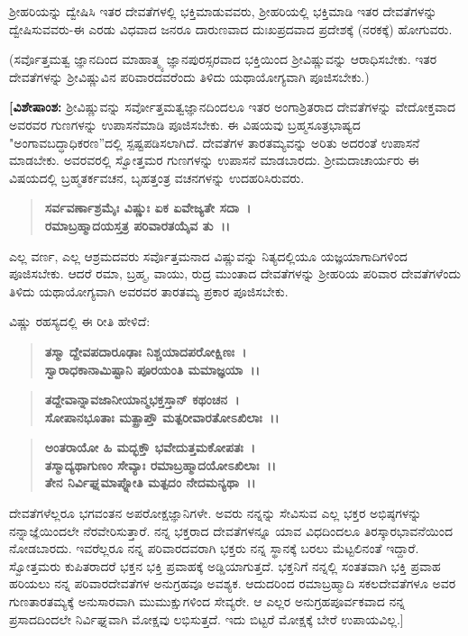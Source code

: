 ಶ‍್ರೀಹರಿಯನ್ನು ದ್ವೇಷಿಸಿ ಇತರ ದೇವತೆಗಳಲ್ಲಿ ಭಕ್ತಿಮಾಡುವವರು, ಶ‍್ರೀಹರಿಯಲ್ಲಿ ಭಕ್ತಿಮಾಡಿ ಇತರ ದೇವತೆಗಳನ್ನು ದ್ವೇಷಿಸುವವರು-ಈ ಎರಡು ವಿಧವಾದ ಜನರೂ ದಾರುಣವಾದ ದುಃಖಪ್ರದವಾದ ಪ್ರದೇಶಕ್ಕೆ (ನರಕಕ್ಕೆ) ಹೋಗುವರು.

(ಸರ್ವೊತ್ತಮತ್ವ ಜ್ಞಾನದಿಂದ ಮಾಹಾತ್ಮ್ಯ ಜ್ಞಾನಪುರಸ್ಸರವಾದ ಭಕ್ತಿಯಿಂದ ಶ‍್ರೀವಿಷ್ಣುವನ್ನು ಆರಾಧಿಸಬೇಕು. ಇತರ ದೇವತೆಗಳನ್ನು ಶ‍್ರೀವಿಷ್ಣುವಿನ ಪರಿವಾರದವರೆಂದು ತಿಳಿದು ಯಥಾಯೋಗ್ಯವಾಗಿ ಪೂಜಿಸಬೇಕು.)

\textbf{[ವಿಶೇಷಾಂಶ:} ಶ‍್ರೀವಿಷ್ಣುವನ್ನು ಸರ್ವೋತ್ತಮತ್ವಜ್ಞಾನದಿಂದಲೂ ಇತರ ಅಂಗಾಶ್ರಿತರಾದ ದೇವತೆಗಳನ್ನು ವೇದೋಕ್ತವಾದ ಅವರವರ ಗುಣಗಳನ್ನು ಉಪಾಸನೆಮಾಡಿ ಪೂಜಿಸಬೇಕು. ಈ ವಿಷಯವು ಬ್ರಹ್ಮಸೂತ್ರಭಾಷ್ಯದ "ಅಂಗಾವಬದ್ಧಾಧಿಕರಣ”ದಲ್ಲಿ ಸ್ಪಷ್ಟಪಡಿಸಲಾಗಿದೆ. ದೇವತೆ\-ಗಳ ತಾರತಮ್ಯವನ್ನು ಅರಿತು ಅದರಂತೆ ಉಪಾಸನೆ ಮಾಡಬೇಕು. ಅವರವರಲ್ಲಿ ಸ್ವೋತ್ತಮರ ಗುಣಗಳನ್ನು ಉಪಾಸನೆ ಮಾಡಬಾರದು. ಶ‍್ರೀಮದಾಚಾರ್ಯರು ಈ ವಿಷಯ\-ದಲ್ಲಿ ಬ್ರಹ್ಮತರ್ಕವಚನ, ಬೃಹತ್ತಂತ್ರ ವಚನಗಳನ್ನು ಉದಹರಿಸಿರುವರು.

\begin{verse}
\textbf{ಸರ್ವವರ್ಣಾಶ್ರಮೈಃ ವಿಷ್ಣುಃ ಏಕ ಏವೇಜ್ಯತೇ ಸದಾ~।}\\\textbf{ರಮಾಬ್ರಹ್ಮಾದಯಸ್ತತ್ರ ಪರಿವಾರತಯೈವ ತು~।।} 
\end{verse}

ಎಲ್ಲ ವರ್ಣ, ಎಲ್ಲ ಆಶ್ರಮದವರು ಸರ್ವೊತ್ತಮನಾದ ವಿಷ್ಣುವನ್ನು ನಿತ್ಯದಲ್ಲಿಯೂ ಯಜ್ಞಯಾಗಾದಿಗಳಿಂದ ಪೂಜಿಸಬೇಕು. ಆದರೆ ರಮಾ, ಬ್ರಹ್ಮ, ವಾಯು, ರುದ್ರ ಮುಂತಾದ ದೇವತೆ\-ಗಳನ್ನು ಶ‍್ರೀಹರಿಯ ಪರಿವಾರ ದೇವತೆಗಳೆಂದು ತಿಳಿದು ಯಥಾಯೋಗ್ಯವಾಗಿ ಅವರವರ ತಾರತಮ್ಯ ಪ್ರಕಾರ ಪೂಜಿಸಬೇಕು.

\begin{flushleft}
ವಿಷ್ಣು ರಹಸ್ಯದಲ್ಲಿ ಈ ರೀತಿ ಹೇಳಿದೆ: 
\end{flushleft}

\begin{verse}
\textbf{ತಸ್ಮಾ ದ್ದೇವಪದಾರೂಢಾಃ ನಿಶ್ಚಯಾದಪರೋಕ್ಷಿಣಃ~।}\\\textbf{ಸ್ವಾರಾಧಕಾನಾಮಿಷ್ಟಾನಿ ಪೂರಯಂತಿ ಮಮಾಜ್ಞಯಾ~।। }
\end{verse}

\begin{verse}
\textbf{ತದ್ದೇವಾನ್ನಾವಜಾನೀಯಾನ್ಮಭಕ್ತಸ್ತಾನ್ ಕಥಂಚನ~।}\\\textbf{ಸೋಪಾನಭೂತಾಃ ಮತ್ಪ್ರಾಪ್ತೌ ಮತ್ಪರೀವಾರತೋಽಖಿಲಾಃ~।।} 
\end{verse}

\begin{verse}
\textbf{ಅಂತರಾಯೋ ಹಿ ಮದ್ಭಕ್ತೌ ಭವೇದುತ್ತಮಕೋಪತಃ~।}\\\textbf{ತಸ್ಮಾದ್ಯಥಾಗುಣಂ ಸೇವ್ಯಾಃ ರಮಾಬ್ರಹ್ಮಾದಯೋಽಖಿಲಾಃ~।। }\\\textbf{ತೇನ ನಿರ್ವಿಘ್ನಮಾಪ್ನೋತಿ ಮತ್ಪದಂ ನೇದಮನ್ಯಥಾ~।।}
\end{verse}

ದೇವತೆಗಳೆಲ್ಲರೂ ಭಗವಂತನ ಅಪರೋಕ್ಷಜ್ಞಾನಿಗಳೇ. ಅವರು ನನ್ನನ್ನು ಸೇವಿಸುವ ಎಲ್ಲ ಭಕ್ತರ ಅಭಿಷ್ಠಗಳನ್ನು ನನ್ನಾಜ್ಞೆಯಿಂದಲೇ ನೆರವೇರಿಸುತ್ತಾರೆ. ನನ್ನ ಭಕ್ತರಾದ ದೇವತೆ\-ಗಳನ್ನೂ ಯಾವ ವಿಧದಿಂದಲೂ ತಿರಸ್ಕಾರಭಾವನೆಯಿಂದ ನೋಡಬಾರದು. ಇವರೆಲ್ಲರೂ ನನ್ನ ಪರಿವಾರದವರಾಗಿ ಭಕ್ತರು ನನ್ನ ಸ್ಥಾನಕ್ಕೆ ಬರಲು ಮೆಟ್ಟಲಿನಂತೆ ಇದ್ದಾರೆ. ಸ್ವೋತ್ತಮರು ಕುಪಿತರಾದರೆ ಭಕ್ತನ ಭಕ್ತಿ ಪ್ರವಾಹಕ್ಕೆ ಅಡ್ಡಿಯಾಗುತ್ತದೆ. ಭಕ್ತನಿಗೆ ನನ್ನಲ್ಲಿ ಸಂತತವಾಗಿ ಭಕ್ತಿ ಪ್ರವಾಹ ಹರಿಯಲು ನನ್ನ ಪರಿವಾರದೇವತೆಗಳ ಅನುಗ್ರಹವೂ ಅವಶ್ಯಕ. ಆದುದರಿಂದ ರಮಾಬ್ರಹ್ಮಾದಿ ಸಕಲದೇವತೆಗಳೂ ಅವರ ಗುಣತಾರತಮ್ಯಕ್ಕೆ ಅನುಸಾರವಾಗಿ ಮುಮುಕ್ಷುಗಳಿಂದ ಸೇವ್ಯರೇ. ಆ ಎಲ್ಲರ ಅನುಗ್ರಹಪೂರ್ವಕವಾದ ನನ್ನ ಪ್ರಸಾದದಿಂದಲೇ ನಿರ್ವಿಘ್ನವಾಗಿ ಮೋಕ್ಷವು ಲಭಿಸುತ್ತದೆ. ಇದು ಬಿಟ್ಟರೆ ಮೋಕ್ಷಕ್ಕೆ ಬೇರೆ ಉಪಾಯವಿಲ್ಲ.]

